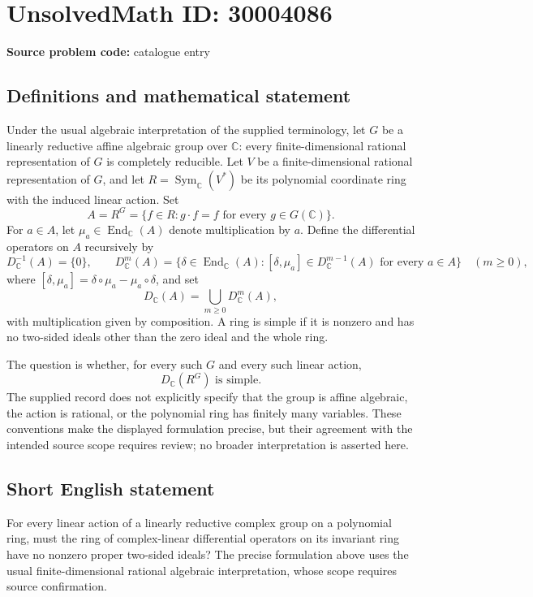 \documentclass[11pt]{article}
\newcommand{\C}{\mathbb{C}}
\begin{document}
\section*{UnsolvedMath ID: 30004086}
\textbf{Source problem code:} catalogue entry
\subsection{Definitions and mathematical statement}
Under the usual algebraic interpretation of the supplied terminology, let \(G\) be a linearly reductive affine algebraic group over \(\C\): every finite-dimensional rational representation of \(G\) is completely reducible. Let \(V\) be a finite-dimensional rational representation of \(G\), and let \(R=\operatorname{Sym}_{\C}(V^*)\) be its polynomial coordinate ring with the induced linear action. Set
\[
A=R^G=\{f\in R:g\cdot f=f\text{ for every }g\in G(\C)\}.
\]
For \(a\in A\), let \(\mu_a\in\operatorname{End}_{\C}(A)\) denote multiplication by \(a\). Define the differential operators on \(A\) recursively by
\[
D^{-1}_{\C}(A)=\{0\},\qquad
D^m_{\C}(A)=\{\delta\in\operatorname{End}_{\C}(A):[\delta,\mu_a]\in D^{m-1}_{\C}(A)\text{ for every }a\in A\}\quad(m\geq0),
\]
where \([\delta,\mu_a]=\delta\circ\mu_a-\mu_a\circ\delta\), and set
\[
D_{\C}(A)=\bigcup_{m\geq0}D^m_{\C}(A),
\]
with multiplication given by composition. A ring is simple if it is nonzero and has no two-sided ideals other than the zero ideal and the whole ring.

The question is whether, for every such \(G\) and every such linear action,
\[
D_{\C}(R^G)\text{ is simple}.
\]
The supplied record does not explicitly specify that the group is affine algebraic, the action is rational, or the polynomial ring has finitely many variables. These conventions make the displayed formulation precise, but their agreement with the intended source scope requires review; no broader interpretation is asserted here.
\subsection{Short English statement}
For every linear action of a linearly reductive complex group on a polynomial ring, must the ring of complex-linear differential operators on its invariant ring have no nonzero proper two-sided ideals? The precise formulation above uses the usual finite-dimensional rational algebraic interpretation, whose scope requires source confirmation.
\end{document}
